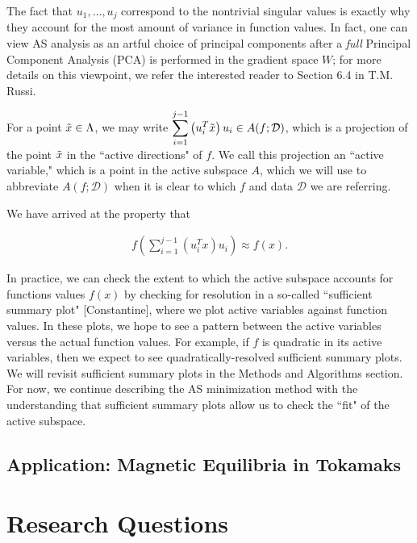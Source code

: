 \documentclass{amsart}
\newcommand{\ds}{\displaystyle}
\begin{document}
The fact that $u_1,\ldots,u_{j}$ correspond to the nontrivial singular values is exactly why they account for the most amount of variance in function values. In fact, one can view AS analysis as an artful choice of principal components after a \textit{full} Principal Component Analysis (PCA) is performed in the gradient space $W$; for more details on this viewpoint, we refer the interested reader to Section 6.4 in T.M. Russi.

For a point $\Tilde{x} \in \Lambda$, we may write $\ds \sum_{i=1}^{j-1}\left( u_i^T \Tilde{x}\right)u_i \in A(f;\mathcal{D})$, which is a projection of the point $\Tilde{x}$ in the ``active directions" of $f$. We call this projection an ``active variable," which is a point in the active subspace $A$, which we will use to abbreviate $A(f;\mathcal{D})$ when it is clear to which $f$ and data $\mathcal{D}$ we are referring.



We have arrived at the property that 

\begin{eqnarray}
f\left(\sum_{i=1}^{j-1} \left(u_i^T x\right) u_i\right) \approx f(x).
\end{eqnarray} 

In practice, we can check the extent to which the active subspace accounts for functions values $f(x)$ by checking for resolution in a so-called ``sufficient summary plot" [Constantine], where we plot active variables against function values. In these plots, we hope to see a pattern between the active variables versus the actual function values. For example, if $f$ is quadratic in its active variables, then we expect to see quadratically-resolved sufficient summary plots. We will revisit sufficient summary plots in the Methods and Algorithms section. For now, we continue describing the AS minimization method with the understanding that sufficient summary plots allow us to check the ``fit" of the active subspace.

\subsection{Application: Magnetic Equilibria in Tokamaks}



\section{Research Questions}
\end{document}
